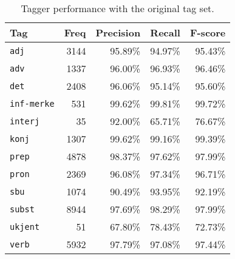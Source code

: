 \documentclass[a4paper,12pt,english]{book}
\begin{document}
\begin{table}
    \centering  
    \smaller[0.5]
    \begin{tabular}{@{}lrrrr@{}}
        \toprule
        \textbf{Tag} &  \textbf{Freq} & \textbf{Precision} & \textbf{Recall} &
        \textbf{F-score} \\
        \midrule
        \texttt{adj} & 3144 & 95.89\% & 94.97\% & 95.43\% \\
        \texttt{adv} & 1337 & 96.00\% & 96.93\% & 96.46\% \\
        \texttt{det} & 2408 & 96.06\% & 95.14\% & 95.60\% \\
        \texttt{inf-merke} & 531 & 99.62\% & 99.81\% & 99.72\% \\
        \texttt{interj} & 35 & 92.00\% & 65.71\% & 76.67\% \\
        \texttt{konj} & 1307 & 99.62\% & 99.16\% & 99.39\% \\
        \texttt{prep} & 4878 & 98.37\% & 97.62\% & 97.99\% \\
        \texttt{pron} & 2369 & 96.08\% & 97.34\% & 96.71\% \\
        \texttt{sbu} & 1074 & 90.49\% & 93.95\% & 92.19\% \\
        \texttt{subst} & 8944 & 97.69\% & 98.29\% & 97.99\% \\
        \texttt{ukjent} & 51 & 67.80\% & 78.43\% & 72.73\% \\
        \texttt{verb} & 5932 & 97.79\% & 97.08\% & 97.44\% \\
        \bottomrule
    \end{tabular}
    \caption{Tagger performance with the original tag set.}
    \label{baselinetagerror}
\end{table}
\end{document}
